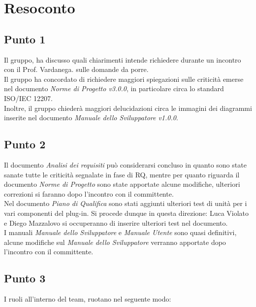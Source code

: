 \section{Resoconto}

\subsection{Punto 1}
Il gruppo, ha discusso quali chiarimenti intende richiedere durante un incontro con il Prof. Vardanega. sulle domande da porre.\\
Il gruppo ha concordato di richiedere maggiori spiegazioni sulle criticità emerse nel documento \textit{Norme di Progetto v3.0.0}, in particolare circa lo standard ISO/IEC 12207. \\
Inoltre, il gruppo chiederà maggiori delucidazioni circa le immagini dei diagrammi inserite nel documento \textit{Manuale dello Sviluppatore v1.0.0}.

\subsection{Punto 2}
Il documento \textit{Analisi dei requisiti} può considerarsi concluso in quanto sono state sanate tutte le criticità segnalate in fase di RQ, mentre per quanto riguarda il documento \textit{Norme di Progetto} sono state apportate alcune modifiche, ulteriori correzioni si faranno dopo l'incontro con il committente.\\
Nel documento \textit{Piano di Qualifica} sono stati aggiunti ulteriori test di unità per i vari componenti del plug-in. Si procede dunque in questa direzione: Luca Violato e Diego Mazzalovo si occuperanno di inserire ulteriori test nel documento. \\
I manuali \textit{Manuale dello Sviluppatore} e \textit{Manuale Utente} sono quasi definitivi, alcune modifiche sul \textit{Manuale dello Sviluppatore} verranno apportate dopo l'incontro con il committente.
 

\subsection{Punto 3}
I ruoli all'interno del team, ruotano nel seguente modo:\\

